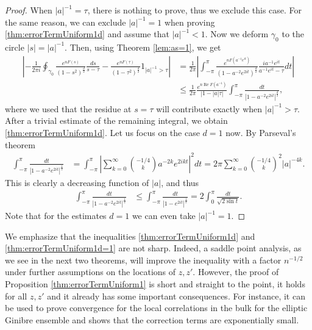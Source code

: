 \documentclass[%
 jmp,
cp,  %
 amsmath,amsthm,amssymb,%
 reprint,%
onecolumn]{revtex4-2}
\begin{document}
\begin{proof}
When $|a|^{-1}=\tau$, there is nothing to prove, thus we exclude this case. For the same reason, we can exclude  $|a|^{-1}=1$ when proving \eqref{thm:errorTermUniform1d} and assume  that $|a|^{-1}<1$. Now we deform $\gamma_0$ to the circle $|s|=|a|^{-1}$. Then, using Theorem \ref{lem:as=1}, we get
\begin{align*}
\left|-\frac{1}{2\pi i} \oint_{\gamma_0} \frac{e^{n F(s)}}{(1-s^2)^\frac{d}{2}} \frac{ds}{s-\tau} - \frac{e^{n F(\tau)}}{(1-\tau^2)^\frac{d}{2}} \mathfrak{1}_{|a|^{-1}>\tau}\right|
&=  \frac{1}{2\pi} \left|\int_{-\pi}^\pi \frac{e^{n F(a^{-1} e^{it})}}{(1-a^{-2} e^{2it})^\frac{d}{2}} \frac{i a^{-1} e^{it}}{a^{-1} e^{it}-\tau} dt\right|\\
&\leq \frac{1}{2\pi} \frac{e^{n \operatorname{Re} F(a^{-1})}}{|1-|a|\tau|} \int_{-\pi}^\pi \frac{dt}{|1-a^{-2} e^{2it}|^\frac{d}{2}},
\end{align*} 
where we used that the residue at $s=\tau$ will contribute exactly when $|a|^{-1}>\tau$. After a trivial estimate of the remaining integral, we obtain \eqref{thm:errorTermUniform1d}. Let us focus on the case $d=1$ now. By Parseval's theorem
\begin{align*}
\int_{-\pi}^\pi \frac{dt}{|1-a^{-2} e^{2it}|^\frac{1}{2}}
&= \int_{-\pi}^\pi \left|\sum_{k=0}^\infty \binom{-1/4}{k} a^{-2k} e^{2i k t}\right|^2 dt
= 2\pi \sum_{k=0}^\infty \binom{-1/4}{k}^2 |a|^{-4k}. 
\end{align*}
This is clearly a decreasing function of $|a|$, and thus
\begin{align*}
\int_{-\pi}^\pi \frac{dt}{|1-a^{-2} e^{2it}|^\frac{1}{2}}
&\leq \int_{-\pi}^\pi \frac{dt}{|1-e^{2it}|^\frac{1}{2}}
= 2 \int_{0}^\pi \frac{dt}{\sqrt{2\sin t}}. 
\end{align*}
Note that for the estimates $d=1$ we can even take $|a|^{-1}=1$. 
\end{proof}

We emphasize that the inequalities \eqref{thm:errorTermUniform1d} and \eqref{thm:errorTermUniform1d=1} are not sharp. Indeed, a saddle point analysis, 
as we see in the next two theorems, will improve the inequality with a factor $ n^{-1/2}$ under further assumptions on the locations of $z,z'$. However, the proof of Proposition \ref{thm:errorTermUniform1} is short and straight to the point, it holds for all $z,z'$ and it already has some important consequences. For instance, it can be used to prove convergence for the local correlations in the bulk for the elliptic Ginibre ensemble and shows that the correction terms are exponentially small.  
\end{document}
